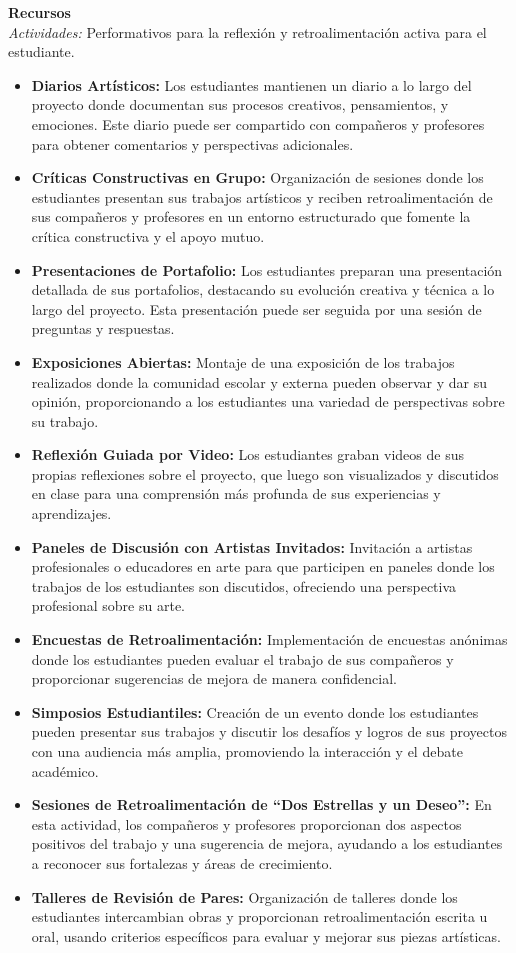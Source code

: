 {\large \textbf{Recursos}}\\
\textit{Actividades: } Performativos para la reflexión y retroalimentación activa para el estudiante.  
\begin{itemize}
    \item \textbf{Diarios Artísticos:} Los estudiantes mantienen un diario a lo largo del proyecto donde documentan sus procesos creativos, pensamientos, y emociones. Este diario puede ser compartido con compañeros y profesores para obtener comentarios y perspectivas adicionales.
    \item \textbf{Críticas Constructivas en Grupo:} Organización de sesiones donde los estudiantes presentan sus trabajos artísticos y reciben retroalimentación de sus compañeros y profesores en un entorno estructurado que fomente la crítica constructiva y el apoyo mutuo.
    \item \textbf{Presentaciones de Portafolio:} Los estudiantes preparan una presentación detallada de sus portafolios, destacando su evolución creativa y técnica a lo largo del proyecto. Esta presentación puede ser seguida por una sesión de preguntas y respuestas.
    \item \textbf{Exposiciones Abiertas:} Montaje de una exposición de los trabajos realizados donde la comunidad escolar y externa pueden observar y dar su opinión, proporcionando a los estudiantes una variedad de perspectivas sobre su trabajo.
    \item \textbf{Reflexión Guiada por Video:} Los estudiantes graban videos de sus propias reflexiones sobre el proyecto, que luego son visualizados y discutidos en clase para una comprensión más profunda de sus experiencias y aprendizajes.
    \item \textbf{Paneles de Discusión con Artistas Invitados:} Invitación a artistas profesionales o educadores en arte para que participen en paneles donde los trabajos de los estudiantes son discutidos, ofreciendo una perspectiva profesional sobre su arte.
    \item \textbf{Encuestas de Retroalimentación:} Implementación de encuestas anónimas donde los estudiantes pueden evaluar el trabajo de sus compañeros y proporcionar sugerencias de mejora de manera confidencial.
    \item \textbf{Simposios Estudiantiles:} Creación de un evento donde los estudiantes pueden presentar sus trabajos y discutir los desafíos y logros de sus proyectos con una audiencia más amplia, promoviendo la interacción y el debate académico.
    \item \textbf{Sesiones de Retroalimentación de ``Dos Estrellas y un Deseo'':} En esta actividad, los compañeros y profesores proporcionan dos aspectos positivos del trabajo y una sugerencia de mejora, ayudando a los estudiantes a reconocer sus fortalezas y áreas de crecimiento.
    \item \textbf{Talleres de Revisión de Pares:} Organización de talleres donde los estudiantes intercambian obras y proporcionan retroalimentación escrita u oral, usando criterios específicos para evaluar y mejorar sus piezas artísticas.
\end{itemize}

